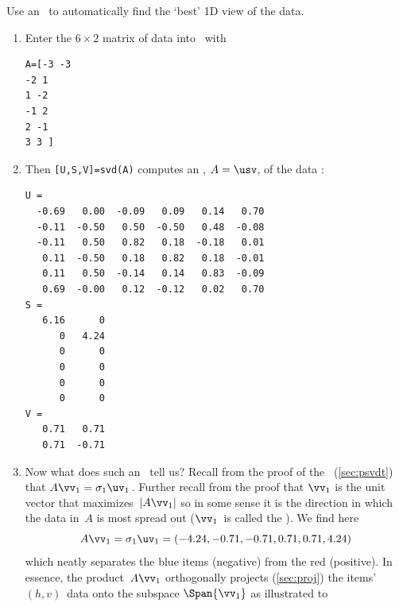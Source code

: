 \begin{example}
\begin{solution} 
Use an \svd\ to automatically find the `best' 1D view of the data.
\begin{enumerate}
\item Enter the \(6\times2\) matrix of data into \script\ with
\begin{verbatim}
A=[-3 -3
-2 1
1 -2
-1 2
2 -1
3 3 ]
\end{verbatim}
\setbox\ajrqrbox\hbox{}%
\marginajrbox%

\item Then \verb|[U,S,V]=svd(A)| computes an \svd, \(A=\usv\), of the data \twodp:
\begin{verbatim}
U =
  -0.69   0.00  -0.09   0.09   0.14   0.70
  -0.11  -0.50   0.50  -0.50   0.48  -0.08
  -0.11   0.50   0.82   0.18  -0.18   0.01
   0.11  -0.50   0.18   0.82   0.18  -0.01
   0.11   0.50  -0.14   0.14   0.83  -0.09
   0.69  -0.00   0.12  -0.12   0.02   0.70
S =
   6.16      0
      0   4.24
      0      0
      0      0
      0      0
      0      0
V =
   0.71   0.71
   0.71  -0.71
\end{verbatim}

\item 
\begin{figbox}{}%
Now what does such an \svd\ tell us?
Recall from the proof of the \svd\ (\cref{sec:psvdt}) that \(A\vv_1=\sigma_1\uv_1\)\,. 
Further recall from the proof that \(\vv_1\) is the unit vector that maximizes~\(|A\vv_1|\) so in some sense it is the direction in which the data in~\(A\) is most spread out (\(\vv_1\)~is called the ).
We find here \twodp
\begin{equation*}
A\vv_1=\sigma_1\uv_1=(-4.24,-0.71,-0.71,0.71,0.71,4.24)
\end{equation*}
which neatly separates the blue items (negative) from the red (positive).
In essence, the product~\(A\vv_1\) orthogonally projects (\cref{sec:proj}) the items' \((h,v)\)~data onto the subspace \(\Span\{\vv_1\}\) as illustrated to 


\end{figbox}
\end{enumerate}
\end{solution}
\end{example}
